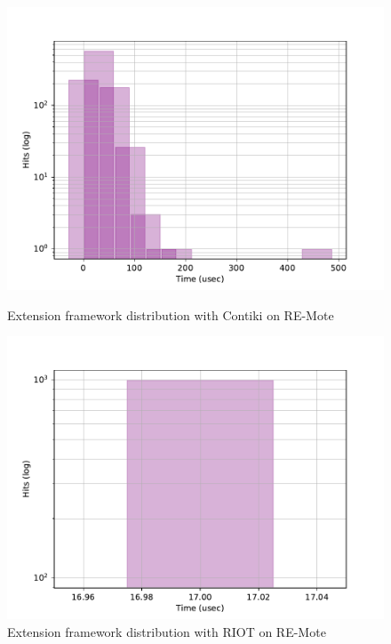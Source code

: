 \begin{figure}[!ht]
  \begin{minipage}{.45\textwidth}
      \centering
      \includegraphics[scale=.4]{assets/extension-framework-contiki-remote.pdf}
      \caption{Extension framework distribution with Contiki on RE-Mote\label{fig:extension-framework-contiki-remote}}
  \end{minipage}\hfill
  \begin{minipage}{.45\textwidth}        
      \centering
      \includegraphics[scale=.4]{assets/extension-framework-riot-remote.pdf}
      \caption{Extension framework distribution with RIOT on RE-Mote\label{fig:extension-framework-riot-remote}}
  \end{minipage}
\end{figure}

